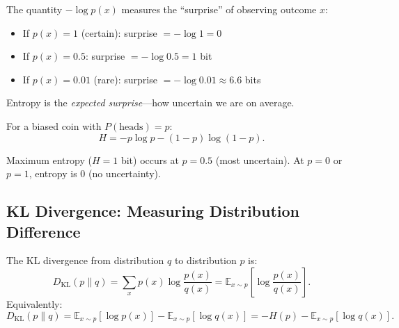 \begin{remark}
    The quantity $-\log p(x)$ measures the ``surprise'' of observing outcome $x$:
    \begin{itemize}
        \item If $p(x) = 1$ (certain): surprise $= -\log 1 = 0$
        \item If $p(x) = 0.5$: surprise $= -\log 0.5 = 1$ bit
        \item If $p(x) = 0.01$ (rare): surprise $= -\log 0.01 \approx 6.6$ bits
    \end{itemize}
    Entropy is the \emph{expected surprise}---how uncertain we are on average.
\end{remark}

\begin{example}
    For a biased coin with $P(\text{heads}) = p$:
    \[
        H = -p \log p - (1-p) \log(1-p).
    \]
    \begin{center}
    \end{center}
    Maximum entropy ($H=1$ bit) occurs at $p=0.5$ (most uncertain). At $p=0$ or $p=1$, entropy is 0 (no uncertainty).
\end{example}

\subsection{KL Divergence: Measuring Distribution Difference}

\begin{definition}\label{def:kl-divergence}
    The KL divergence from distribution $q$ to distribution $p$ is:
    \[
        D_{\mathrm{KL}}(p \| q) = \sum_{x} p(x) \log \frac{p(x)}{q(x)} = \mathbb{E}_{x \sim p}\left[ \log \frac{p(x)}{q(x)} \right].
    \]
    Equivalently:
    \[
        D_{\mathrm{KL}}(p \| q) = \mathbb{E}_{x \sim p}[\log p(x)] - \mathbb{E}_{x \sim p}[\log q(x)] = -H(p) - \mathbb{E}_{x \sim p}[\log q(x)].
    \]
\end{definition}

